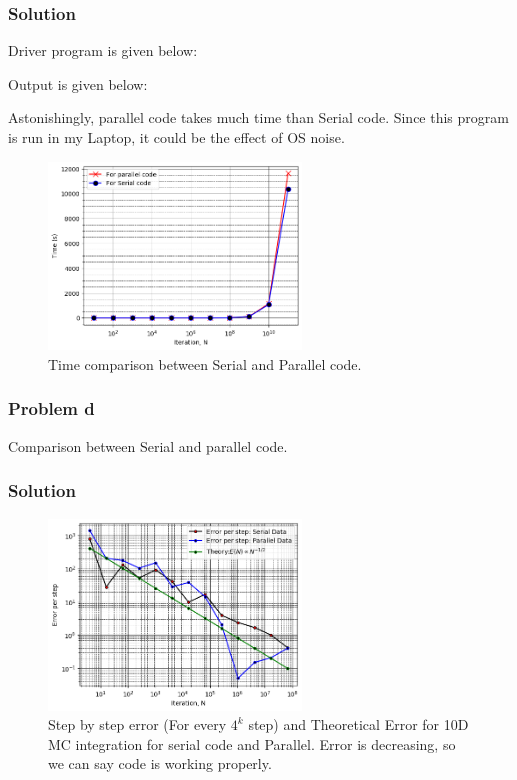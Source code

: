\documentclass{article}
\begin{document}
 \subsubsection*{Solution}
 Driver program is given below:
 
 Output is given below:
  
  
Astonishingly, parallel code takes much time than Serial code. Since this program is run in my Laptop, it could be the effect of OS noise.
\begin{figure}[h!]
  \centering
    \includegraphics[width=0.6\textwidth]{Comparison_between_serial_and_parallel_times}
    \caption{Time comparison between Serial and Parallel code.} 
    \label{t1a}
\end{figure}



\subsubsection*{Problem d}
Comparison between Serial and parallel code.
 \subsubsection*{Solution}
\begin{figure}[h!]
  \centering
    \includegraphics[width=0.6\textwidth]{Comparison_between_serial_and_parallel.png}
    \caption{Step by step error (For every $4^k$ step) and Theoretical Error for 10D MC integration for serial code and Parallel. Error is decreasing, so we can say code is working properly.} 
\end{figure}
\end{document}

